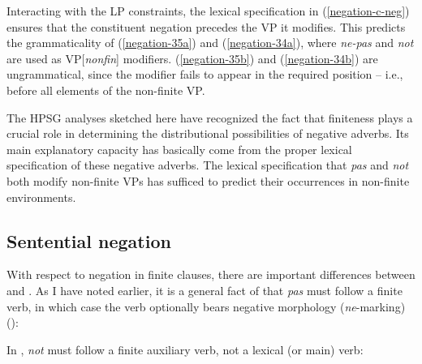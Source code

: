 \documentclass[output=paper,biblatex,babelshorthands,newtxmath,draftmode,colorlinks,citecolor=brown]{langscibook}
\begin{document}
\begin{exe}
\begin{xlist}
\begin{exe}
\begin{xlist}
\noindent
Interacting with the LP constraints, the lexical specification in (\ref{negation-c-neg}) ensures
that the constituent negation precedes the VP it modifies. This predicts the grammaticality of
(\ref{negation-35a}) and (\ref{negation-34a}), where \textit{ne-pas} and \textit{not} are used as
VP[\textit{nonfin}] modifiers.  (\ref{negation-35b}) and (\ref{negation-34b}) are ungrammatical,
since the modifier fails to appear in the required position -- i.e., before all elements of the
non-finite VP.

The HPSG analyses sketched here have recognized the fact that finiteness plays a crucial role in
determining the distributional possibilities of negative adverbs. Its main explanatory capacity has
basically come from the proper lexical specification of these negative adverbs. The lexical
specification that \textit{pas} and \textit{not} both modify non-finite VPs has sufficed to predict
their occurrences in non-finite environments.



\subsection{Sentential negation}
\label{sec-sentential-negation}\label{negation:sec-sentential-negation}

With respect to negation in finite clauses, there are important differences between  and .
As I have noted earlier, it is a general fact of  that \textit{pas} must follow a finite verb, in which case the verb optionally bears negative morphology (\textit{ne}-marking) (\citealp[]{KS:02}):

\eal
{}
\zl
\noindent
In , \textit{not} must follow a finite
auxiliary verb, not a lexical (or main) verb:

\eal
{}
\zl


\end{xlist}
\end{exe}
\end{xlist}
\end{exe}
\end{document}
